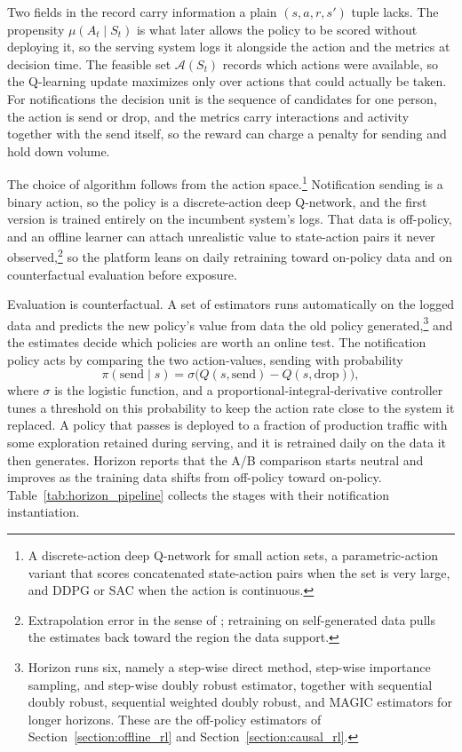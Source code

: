 Two fields in the record carry information a plain $(s,a,r,s')$ tuple lacks. The propensity $\mu(A_t\mid S_t)$ is what later allows the policy to be scored without deploying it, so the serving system logs it alongside the action and the metrics at decision time. The feasible set $\mathcal{A}(S_t)$ records which actions were available, so the Q-learning update maximizes only over actions that could actually be taken. For notifications the decision unit is the sequence of candidates for one person, the action is send or drop, and the metrics carry interactions and activity together with the send itself, so the reward can charge a penalty for sending and hold down volume.

The choice of algorithm follows from the action space.\footnote{A discrete-action deep Q-network for small action sets, a parametric-action variant that scores concatenated state-action pairs when the set is very large, and DDPG or SAC when the action is continuous.} Notification sending is a binary action, so the policy is a discrete-action deep Q-network, and the first version is trained entirely on the incumbent system's logs. That data is off-policy, and an offline learner can attach unrealistic value to state-action pairs it never observed,\footnote{Extrapolation error in the sense of \citet{Fujimoto2019}; retraining on self-generated data pulls the estimates back toward the region the data support.} so the platform leans on daily retraining toward on-policy data and on counterfactual evaluation before exposure.

Evaluation is counterfactual. A set of estimators runs automatically on the logged data and predicts the new policy's value from data the old policy generated,\footnote{Horizon runs six, namely a step-wise direct method, step-wise importance sampling, and step-wise doubly robust estimator, together with sequential doubly robust, sequential weighted doubly robust, and MAGIC estimators for longer horizons. These are the off-policy estimators of Section~\ref{section:offline_rl} and Section~\ref{section:causal_rl}.} and the estimates decide which policies are worth an online test. The notification policy acts by comparing the two action-values, sending with probability
\begin{equation}
\pi(\text{send}\mid s) = \sigma\!\big(Q(s,\text{send}) - Q(s,\text{drop})\big),
\end{equation}
where $\sigma$ is the logistic function, and a proportional-integral-derivative controller tunes a threshold on this probability to keep the action rate close to the system it replaced. A policy that passes is deployed to a fraction of production traffic with some exploration retained during serving, and it is retrained daily on the data it then generates. Horizon reports that the A/B comparison starts neutral and improves as the training data shifts from off-policy toward on-policy. Table~\ref{tab:horizon_pipeline} collects the stages with their notification instantiation.


